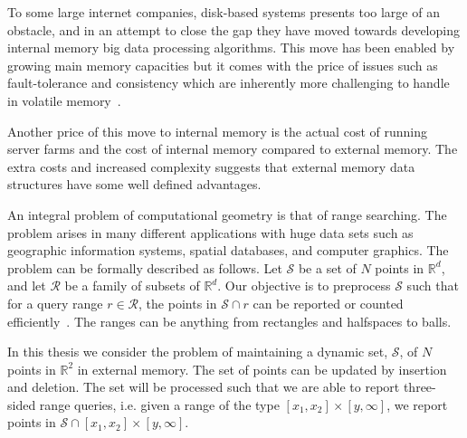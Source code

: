 \documentclass[twoside,11pt,openright]{report}
\begin{document}
To some large internet companies, disk-based systems presents too large of an obstacle, and in an attempt to close the gap they have moved towards developing internal memory big data processing algorithms. This move has been enabled by growing main memory capacities but it comes with the price of issues such as fault-tolerance and consistency which are inherently more challenging to handle in volatile memory~\cite{Zhang2015}.

Another price of this move to internal memory is the actual cost of running server farms and the cost of internal memory compared to external memory. The extra costs and increased complexity suggests that external memory data structures have some well defined advantages.

An integral problem of computational geometry is that of range searching. The problem arises in many different applications with huge data sets such as geographic information systems, spatial databases, and computer graphics. The problem can be formally described as follows. Let $\mathcal{S}$ be a set of $N$ points in $\mathbb{R}^d$, and let $\mathcal{R}$ be a family of subsets of $\mathbb{R}^d$. Our objective is to preprocess $\mathcal{S}$ such that for a query range $r \in \mathcal{R}$, the points in $\mathcal{S} \cap r$ can be reported or counted efficiently~\cite{Agarwal99geometricrange}. The ranges can be anything from rectangles and halfspaces to balls.

In this thesis we consider the problem of maintaining a dynamic set, $\mathcal{S}$, of $N$ points in $\mathbb{R}^2$ in external memory. The set of points can be updated by insertion and deletion. The set will be processed such that we are able to report three-sided range queries, i.e. given a range of the type $[x_1,x_2] \times [y,\infty]$, we report points in $\mathcal{S} \cap [x_1,x_2] \times [y,\infty]$.
\end{document}
